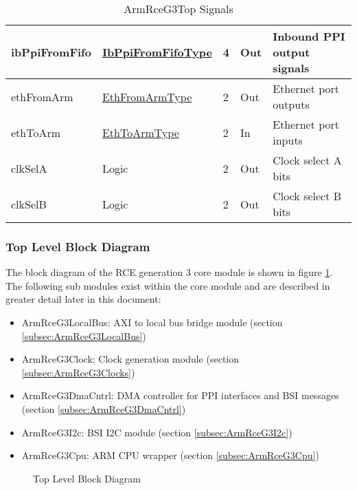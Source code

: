 \documentclass[11pt]{article}
\begin{document}
\begin{table}[H]
\begin{tabular}{| l | l | l | l | l | }
      \hline ibPpiFromFifo     & \hyperref[subsec:IbPpiFromFifoType]{IbPpiFromFifoType} & 4      & Out       & Inbound PPI output signals \\
      \hline ethFromArm        & \hyperref[subsec:EthFromArmType]{EthFromArmType}      & 2      & Out       & Ethernet port outputs \\
      \hline ethToArm          & \hyperref[subsec:EthToArmType]{EthToArmType}             & 2      & In        & Ethernet port inputs  \\
      \hline clkSelA           & Logic                                                    & 2      & Out       & Clock select A bits   \\
      \hline clkSelB           & Logic                                                    & 2      & Out       & Clock select B bits   \\
      \hline
   \end{tabular}
   \caption{ArmRceG3Top Signals}
   \label{tab:top_signals}
\end{table}

\subsubsection{Top Level Block Diagram}

The block diagram of the RCE generation 3 core module is shown in figure \ref{fig:top_level_block}. The following sub modules
exist within the core module and are described in greater detail later in this document:

\begin{itemize}
   \item ArmRceG3LocalBus: AXI to local bus bridge module (section \ref{subsec:ArmRceG3LocalBus})
   \item ArmRceG3Clock: Clock generation module (section \ref{subsec:ArmRceG3Clocks})
   \item ArmRceG3DmaCntrl: DMA controller for PPI interfaces and BSI messages (section \ref{subsec:ArmRceG3DmaCntrl})
   \item ArmRceG3I2c: BSI I2C module (section \ref{subsec:ArmRceG3I2c})
   \item ArmRceG3Cpu: ARM CPU wrapper (section \ref{subsec:ArmRceG3Cpu})
\end{itemize}

\begin{figure}[H]
   \centering
   \caption{Top Level Block Diagram}
   \label{fig:top_level_block}
\end{figure}
\end{document}
